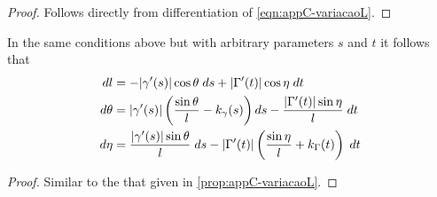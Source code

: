 \begin{proof}
Follows directly from differentiation of  \cref{eqn:appC-variacaoL}.
\end{proof}

\begin{proposition}
	In the same conditions above but with arbitrary parameters $s$ and $t$ it follows that
	\begin{equation}
	\aligned
	dl &= -|\gamma'(s)|  \cos\theta  \; ds + |\Gamma^\prime(t)|  \cos\eta\;  dt\\
 	d\theta &=|\gamma'(s)|  \left( \frac{\sin\theta }{l }-k_\gamma(s) \right)ds     - \frac{ |\Gamma^\prime(t) | \sin\eta}{l }\;dt\\
 d\eta&=   \frac{ |\gamma'(s)| \sin\theta }{l } \;  ds  - |\Gamma^\prime(t)| \left(  \frac{\sin\eta}{l }+k_\Gamma(t) \right) \;  dt
\endaligned
\label{eq:appC-variacaoL2}
\end{equation}
\label{prop:appC-variacaoG}
\end{proposition}

\begin{proof}
Similar to the that given in \cref{prop:appC-variacaoL}.
\end{proof}

